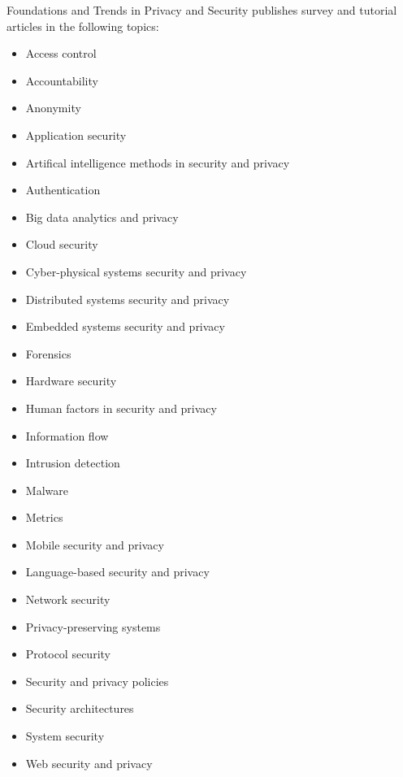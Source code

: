 


\journalaimsandscope
 {%
  Foundations and Trends\textsuperscript{\textregistered} in
 Privacy and Security publishes
 survey and tutorial articles in the following topics:
 \begin{multicols}{2}\raggedcolumns
\footnotesize
 \begin{itemize}
\item{Access control}
\item{Accountability}
\item{Anonymity}
\item{Application security}
\item{Artifical intelligence methods in security and privacy}
\item{Authentication}
\item{Big data analytics and privacy}
\item{Cloud security}
\item{Cyber-physical systems security and privacy}
\item{Distributed systems security and privacy}
\item{Embedded systems security and privacy}
\item{Forensics}
\item{Hardware security}
\item{Human factors in security and privacy}
\item{Information flow}
\item{Intrusion detection}
\item{Malware}
\item{Metrics}
\item{Mobile security and privacy}
\item{Language-based security and privacy}
\item{Network security}
\item{Privacy-preserving systems}
\item{Protocol security}
\item{Security and privacy policies}
\item{Security architectures}
\item{System security}
\item{Web security and privacy}
\end{itemize}
\normalsize
 \end{multicols}
 }


